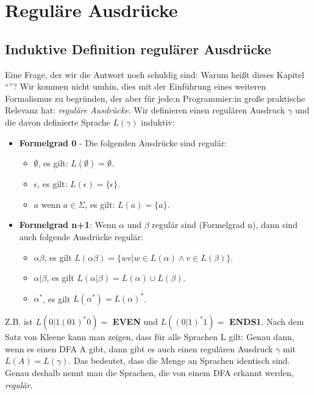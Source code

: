 \section{Reguläre Ausdrücke}\label{regex}

\subsection{Induktive Definition regulärer Ausdrücke}
Eine Frage, der wir die Antwort noch schuldig sind:
Warum heißt dieses Kapitel ``''?
Wir kommen nicht umhin, dies mit der Einführung eines weiteren Formalismus zu begründen,
der aber für jede:n Programmier:in große praktische Relevanz hat:
\emph{reguläre Ausdrücke}.
Wir definieren einen regulären Ausdruck $\gamma$
und die davon definierte Sprache $L(\gamma)$ induktiv:
\begin{itemize}
    \item \textbf{Formelgrad 0} - Die folgenden Ausdrücke sind regulär:
        \begin{itemize}
            \item $\emptyset$, es gilt: $L(\emptyset) = \emptyset$.
            \item $\epsilon$,  es gilt: $L(\epsilon) = \{\epsilon\}$.
            \item $a$ wenn $a \in \Sigma$, es gilt: $L(a) = \{a\}$.
        \end{itemize}
    \item \textbf{Formelgrad n+1}: Wenn $\alpha$  und $\beta$ regulär sind (Formelgrad n),
        dann sind auch folgende Ausdrücke regulär:
        \begin{itemize}
            \item $\alpha\beta$,
                es gilt $L(\alpha\beta) = \{wv| w \in L(\alpha) \wedge v \in L(\beta)\}$.
            \item $\alpha|\beta$,
                es gilt $L(\alpha|\beta) = L(\alpha) \cup L(\beta)$. 
            \item $\alpha^*$,
                es gilt $L(\alpha^*) = L(\alpha)^*$.
        \end{itemize}
\end{itemize}

Z.B. ist $L(0|1(01)^*0) =$ \textbf{EVEN} und $L((0|1)^*1) =$ \textbf{ENDS1}.
Nach dem Satz von Kleene kann man zeigen, dass für alle Sprachen L gilt:
Genau dann, wenn es einen DFA A gibt, dann gibt es auch einen regulären Ausdruck $\gamma$
mit $L(A) = L(\gamma)$.
Das bedeutet, dass die Menge an Sprachen identisch sind.
Genau deshalb nennt man die Sprachen, die von einem DFA erkannt werden, \emph{regulär}.

